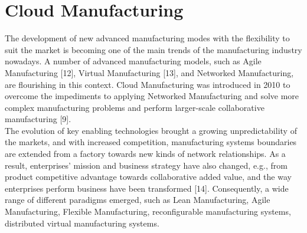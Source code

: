 \chapter{Cloud Manufacturing}
The development of new advanced manufacturing modes with the flexibility to suit the market is becoming one of the main trends of the manufacturing industry nowadays. A number of advanced manufacturing models, such as Agile Manufacturing [12], Virtual Manufacturing [13], and Networked Manufacturing, are flourishing in this context. Cloud Manufacturing was introduced in 2010 to overcome the impediments to applying Networked Manufacturing and solve more complex manufacturing problems and perform larger-scale collaborative manufacturing [9].\\
The evolution of key enabling technologies brought a growing unpredictability of the markets, and with increased competition, manufacturing systems boundaries are extended from a factory towards new kinds of network relationships. As a result, enterprises’ mission and business strategy have also changed, e.g., from product competitive advantage towards collaborative added value, and the way enterprises perform business have been transformed [14]. Consequently, a wide range of different paradigms emerged, such as Lean Manufacturing, Agile Manufacturing, Flexible Manufacturing, reconfigurable manufacturing systems, distributed virtual manufacturing systems.\\
